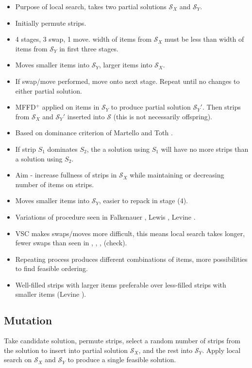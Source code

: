 \documentclass{elsarticle}
\begin{document}
\begin{itemize}
	\item Purpose of local search, takes two partial solutions $\mathcal{S}_X$ and $\mathcal{S}_Y$.
	\item Initially permute strips.
	\item 4 stages, 3 swap, 1 move. width of items from $\mathcal{S}_X$ must be less than width of items from $\mathcal{S}_Y$ in first three stages.
	\item Moves smaller items into $\mathcal{S}_Y$, larger items into $\mathcal{S}_X$.
	\item If swap/move performed, move onto next stage. Repeat until no changes to either partial solution.
	\item MFFD$^+$ applied on items in $\mathcal{S}_Y$ to produce partial solution $\mathcal{S}_Y'$. Then strips from $\mathcal{S}_X$ and $\mathcal{S}_Y'$ inserted into $\mathcal{S}$ (this is not necessarily offspring).
	\item Based on dominance criterion of Martello and Toth \cite{martello1990l}.
	\item If strip $S_1$ dominates $S_2$, the a solution using $S_1$ will have no more strips than a solution using $S_2$.
	\item Aim - increase fullness of strips in $\mathcal{S}_X$ while maintaining or decreasing number of items on strips.
	\item Moves smaller items into $\mathcal{S}_Y$, easier to repack in stage (4).
	\item Variations of procedure seen in Falkenauer \cite{falkenauer1996}, Lewis \cite{lewis2009} \cite{lewis2017}, Levine \cite{levine2004}.
	\item VSC makes swaps/moves more difficult, this means local search takes longer, fewer swaps than seen in \cite{lewis2009}, \cite{lewis2017}, \cite{levine2004}, \cite{falkenauer1996} (check).
	\item Repeating process produces different combinations of items, more possibilities to find feasible ordering.
	\item Well-filled strips with larger items preferable over less-filled strips with smaller items (Levine \cite{levine2004}).
\end{itemize}

\subsection{Mutation}
\label{sub:mutation}
Take candidate solution, permute strips, select a random number of strips from the solution to insert into partial solution $\mathcal{S}_X$, and the rest into $\mathcal{S}_Y$. Apply local search on $\mathcal{S}_X$ and $\mathcal{S}_Y$ to produce a single feasible solution.
\end{document}
